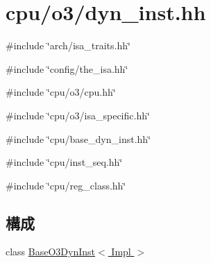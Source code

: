 \hypertarget{o3_2dyn__inst_8hh}{
\section{cpu/o3/dyn\_\-inst.hh}
\label{o3_2dyn__inst_8hh}
}
{\ttfamily \#include \char`\"{}arch/isa\_\-traits.hh\char`\"{}}\par
{\ttfamily \#include \char`\"{}config/the\_\-isa.hh\char`\"{}}\par
{\ttfamily \#include \char`\"{}cpu/o3/cpu.hh\char`\"{}}\par
{\ttfamily \#include \char`\"{}cpu/o3/isa\_\-specific.hh\char`\"{}}\par
{\ttfamily \#include \char`\"{}cpu/base\_\-dyn\_\-inst.hh\char`\"{}}\par
{\ttfamily \#include \char`\"{}cpu/inst\_\-seq.hh\char`\"{}}\par
{\ttfamily \#include \char`\"{}cpu/reg\_\-class.hh\char`\"{}}\par
\subsection*{構成}
\begin{DoxyCompactItemize}
\item 
class \hyperlink{classBaseO3DynInst}{BaseO3DynInst$<$ Impl $>$}
\end{DoxyCompactItemize}
